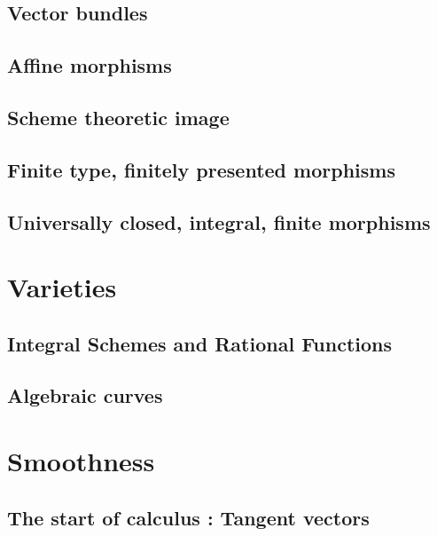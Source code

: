 \documentclass{article}
\begin{document}
  \subsection{Vector bundles}
  \subsection{Affine morphisms}
  \subsection{Scheme theoretic image}
  \subsection{Finite type, finitely presented morphisms}
  \subsection{Universally closed, integral, finite morphisms}

\section{Varieties}
  \subsection{Integral Schemes and Rational Functions}
  \subsection{Algebraic curves}

\section{Smoothness}
  \subsection{The start of calculus : Tangent vectors}
\end{document}
